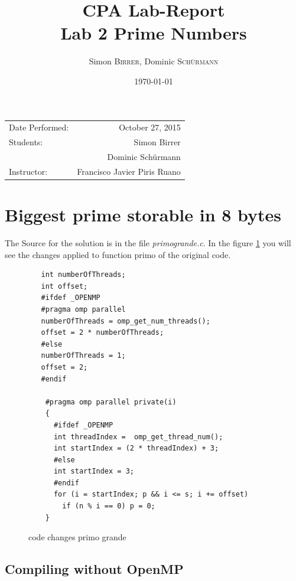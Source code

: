 \documentclass[11pt,a4paper]{article}
\title{CPA Lab-Report \\ Lab 2 Prime Numbers} %
\author{Simon \textsc{Birrer}, Dominic \textsc{Sch\"urmann}} %
\date{\today} %
\begin{document}
\maketitle %

\begin{center}
\begin{tabular}{l r}
Date Performed: & October 27, 2015 \\ %
Students: & Simon Birrer \\ %
& Dominic Sch\"urmann \\
Instructor: & Francisco Javier Piris Ruano %
\end{tabular}
\end{center}

\bigskip

\tableofcontents

\pagebreak

\section{Biggest prime storable in 8 bytes}

The Source for the solution is in the file \textit{primo\textunderscore  grande.c}. In the figure \ref{code_primogrande} you will see the changes applied to function primo of the original code.


\begin{figure}[h]
\label{code_primogrande}
\begin{lstlisting}
   int numberOfThreads;
   int offset;
   #ifdef _OPENMP
   #pragma omp parallel
   numberOfThreads = omp_get_num_threads();
   offset = 2 * numberOfThreads;
   #else
   numberOfThreads = 1;
   offset = 2;
   #endif
    
    #pragma omp parallel private(i)
    {
      #ifdef _OPENMP
      int threadIndex =  omp_get_thread_num();
      int startIndex = (2 * threadIndex) + 3;
      #else
      int startIndex = 3;
      #endif
      for (i = startIndex; p && i <= s; i += offset)
        if (n % i == 0) p = 0;          
    }
\end{lstlisting} 
\caption{code changes primo grande}
\end{figure}


\subsection{Compiling without OpenMP}
\end{document}
